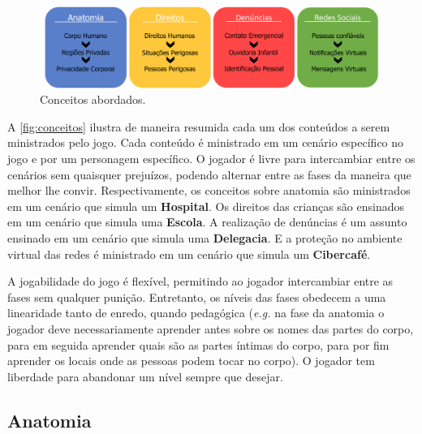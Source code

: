 \begin{figure}[hbt!]
  \caption{\label{fig:conceitos}Conceitos abordados.}\vspace{-0.3cm}
  \begin{center}
    \includegraphics[width=\linewidth]{./Visuais/EsquemaFases2.pdf}
    \end{center}\vspace{-0.3cm}
\end{figure}

\vspace{-0.4cm}

A \autoref{fig:conceitos} ilustra de maneira resumida cada um dos conteúdos a serem ministrados pelo jogo. Cada conteúdo é ministrado em um cenário específico no jogo e por um personagem específico. O jogador é livre para intercambiar entre os cenários sem quaisquer prejuízos, podendo alternar entre as fases da maneira que melhor lhe convir. Respectivamente, os conceitos sobre anatomia são ministrados em um cenário que simula um \textbf{Hospital}. Os direitos das crianças são ensinados em um cenário que simula uma \textbf{Escola}. A realização de denúncias é um assunto ensinado em um cenário que simula uma \textbf{Delegacia}. E a proteção no ambiente virtual das redes é ministrado em um cenário que simula um \textbf{Cibercafé}.

A jogabilidade do jogo é flexível, permitindo ao jogador intercambiar entre as fases sem qualquer punição. Entretanto, os níveis das fases obedecem a uma linearidade tanto de enredo, quando pedagógica (\textit{e.g.} na fase da anatomia o jogador deve necessariamente aprender antes sobre os nomes das partes do corpo, para em seguida aprender quais são as partes íntimas do corpo, para por fim aprender os locais onde as pessoas podem tocar no corpo). O jogador tem liberdade para abandonar um nível sempre que desejar. %


\subsection{Anatomia}\label{subsec:1}

